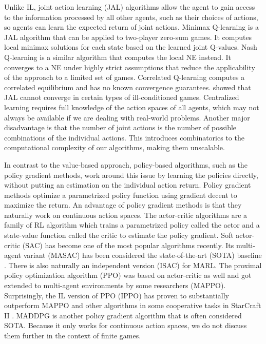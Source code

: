 \documentclass[]{interact}
\theoremstyle{plain}%
\theoremstyle{definition}
\theoremstyle{remark}
\begin{document}
Unlike IL, joint action learning (JAL) algorithms allow the agent to gain access to the information processed by all other agents, such as their choices of actions, so agents can learn the expected return of joint actions. Minimax Q-learning \cite{littman1994markov} is a JAL algorithm that can be applied to two-player zero-sum games. It computes local minimax solutions for each state based on the learned joint Q-values. Nash Q-learning \cite{hu2003nash} is a similar algorithm that computes the local NE instead. It converges to a NE under highly strict assumptions that reduce the applicability of the approach to a limited set of games. Correlated Q-learning \cite{greenwald2003correlated} computes a correlated equilibrium and has no known convergence guarantees. \cite{zinkevich2005cyclic} showed that JAL cannot converge in certain types of ill-conditioned games. Centralized learning requires full knowledge of the action spaces of all agents, which may not always be available if we are dealing with real-world problems. Another major disadvantage is that the number of joint actions is the number of possible combinations of the individual actions. This introduces combinatorics to the computational complexity of our algorithms, making them unscalable.

In contrast to the value-based approach, policy-based algorithms, such as the policy gradient methods, work around this issue by learning the policies directly, without putting an estimation on the individual action return. Policy gradient methods optimize a parametrized policy function using gradient decent to maximize the return. An advantage of policy gradient methods is that they naturally work on continuous action spaces. The actor-critic algorithms are a family of RL algorithm which trains a parametrized policy called the actor and a state-value function called the critic to estimate the policy gradient. Soft actor-critic (SAC) \cite{haarnoja2018soft} has become one of the most popular algorithms recently. Its multi-agent variant (MASAC) has been considered the state-of-the-art (SOTA) baseline \cite{yu2020benchmarking, zhang2020lyapunov}. There is also naturally an independent version (ISAC) for MARL. The proximal policy optimization algorithm (PPO) \cite{schulman2017proximal} was based on actor-critic as well and got extended to multi-agent environments by some researchers \cite{yu2020benchmarking, yu2022surprising} (MAPPO). Surprisingly, the IL version of PPO (IPPO) has proven to substantially outperform MAPPO and other algorithms in some cooperative tasks in StarCraft II \cite{de2020independent}. MADDPG \cite{lowe2017multi} is another policy gradient algorithm that is often considered SOTA. Because it only works for continuous action spaces, we do not discuss them further in the context of finite games.
\end{document}
